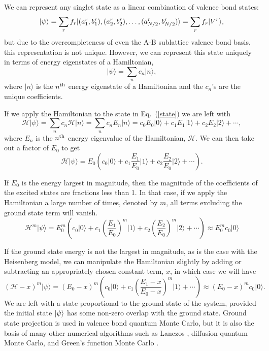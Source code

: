 We can represent any singlet state as a linear combination of valence bond states:
\begin{equation}
	\lvert {\psi} \rangle = \sum_r f_r \lvert {(a_1^r,b_1^r),(a_2^r,b_2^r),\dots,(a_{N/2}^r,b_{N/2}^r)} \rangle
	=  \sum_r f_r \lvert {V^r} \rangle,
\end{equation}
but due to the overcompleteness of even the A-B sublattice valence bond basis, this representation is not unique.
However, we can represent this state uniquely in terms of energy eigenstates of a Hamiltonian,
\begin{equation}
\lvert \psi \rangle = \sum_n c_n \lvert n \rangle,
\label{state}
\end{equation}
where $\lvert n \rangle$ is the $n^{\rm{th}}$ energy eigenstate of a Hamiltonian and the 
$c_n$\!'s are
the unique coefficients.

If we apply the Hamiltonian to the state in Eq.~(\ref{state}) we are left with
\begin{equation}
\mathcal{H}\lvert \psi \rangle = \sum_n c_n \mathcal{H} \lvert n \rangle =
 		\sum_n c_n E_n \lvert n \rangle = 
		c_0 E_0 \lvert 0 \rangle + c_1 E_1 \lvert 1 \rangle +
		c_2 E_2 \lvert 2 \rangle + \cdots,
\end{equation}
where $E_n$ is the $n^{\rm{th}}$ energy eigenvalue of the Hamiltonian, $\mathcal{H}$.
We can then take out a factor of $E_0$ to get
\begin{equation}
\mathcal{H}\lvert \psi \rangle =
		E_0 \left(c_0 \lvert 0 \rangle + c_1 \frac{E_1}{E_0} \lvert 1 \rangle +
		c_2\frac{ E_2}{E_0} \lvert 2 \rangle + \cdots \right).
\end{equation}

If $E_0$ is the energy largest in magnitude, then the magnitude of the coefficients
of the excited states are fractions less than 1.  
In that case, if we apply the Hamiltonian a large number of times, denoted by $m$, all terms excluding
the ground state term will vanish.
\begin{equation}
\mathcal{H}^m\lvert \psi \rangle =
		E_0^m \left(c_0 \lvert 0 \rangle + 
		c_1 \left(\frac{E_1}{E_0}\right)^m \lvert 1 \rangle +
		c_2\left(\frac{ E_2}{E_0}\right)^m \lvert 2 \rangle + \cdots \right)
		\approx E_0^m c_0 \lvert 0 \rangle
\end{equation}

If the ground state energy is not the largest in magnitude, as is the case with the Heisenberg
model, we can manipulate the Hamiltonian slightly by adding or subtracting an
appropriately chosen constant term, $x$, in which case we will have
\begin{equation}
(\mathcal{H}-x)^m\lvert \psi \rangle =
		(E_0-x)^m \left(c_0 \lvert 0 \rangle + 
		c_1 \left(\frac{E_1-x}{E_0-x}\right)^m \lvert 1 \rangle  + \cdots \right)
		\approx (E_0-x)^m c_0 \lvert 0 \rangle.
\end{equation}
We are left with a state proportional to the ground state of the system, provided the initial state $\lvert {\psi} \rangle$ has some non-zero overlap with the ground state.
Ground state projection is used in valence bond quantum Monte Carlo, but it is also the basis of many other numerical algorithms such as Lanczos \cite{Lanczos}, diffusion quantum Monte Carlo, and Green's function Monte Carlo \cite{Ceperley1986}. 

